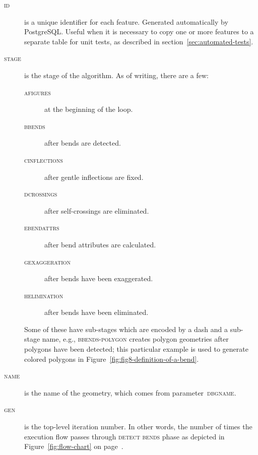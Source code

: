 \documentclass[a4paper]{article}
\newcommand{\onpage}[1]{\ref{#1} on page~\pageref{#1}}
\begin{document}
\begin{description}

    \item[\normalfont\textsc{id}] is a unique identifier for each feature.
        Generated automatically by PostgreSQL. Useful when it is necessary to
        copy one or more features to a separate table for unit tests, as
        described in section~\ref{sec:automated-tests}.

    \item[\normalfont\textsc{stage}] is the stage of the algorithm. As of
        writing, there are a few:
        \begin{description}
            \item[\normalfont\textsc{afigures}] at the beginning of the loop.
            \item[\normalfont\textsc{bbends}] after bends are detected.

            \item[\normalfont\textsc{cinflections}] after gentle inflections
                are fixed.

            \item[\normalfont\textsc{dcrossings}] after self-crossings are
                eliminated.

            \item[\normalfont\textsc{ebendattrs}] after bend attributes are
                calculated.

            \item[\normalfont\textsc{gexaggeration}] after bends have been
                exaggerated.

            \item[\normalfont\textsc{helimination}] after bends have been
                eliminated.

        \end{description}

        Some of these have sub-stages which are encoded by a dash and a
        sub-stage name, e.g., \textsc{bbends-polygon} creates polygon
        geometries after polygons have been detected; this particular example
        is used to generate colored polygons in
        Figure~\ref{fig:fig8-definition-of-a-bend}.

    \item[\normalfont\textsc{name}] is the name of the geometry, which comes from
        parameter~\textsc{dbgname}.

    \item[\normalfont\textsc{gen}] is the top-level iteration number. In other
        words, the number of times the execution flow passes through
        \textsc{detect bends} phase as depicted in
        Figure~\onpage{fig:flow-chart}.


\end{description}
\end{document}
